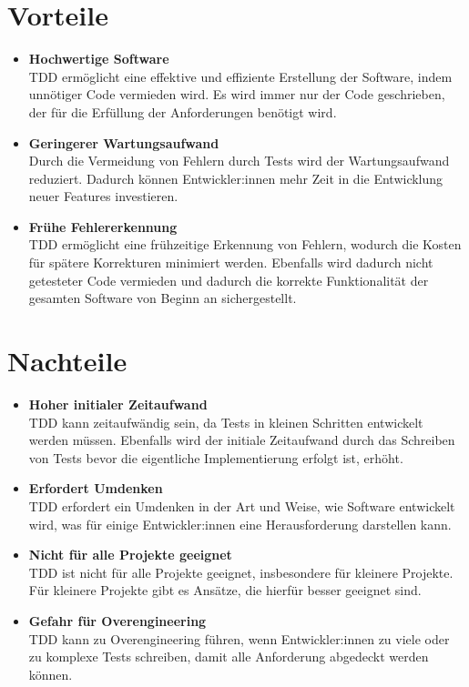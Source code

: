 \documentclass[a0,landscape]{a0poster}
\begin{document}
\begin{multicols}{4}
\section*{Vorteile}
\begin{itemize}
    \item \textbf{Hochwertige Software}\\
    TDD ermöglicht eine effektive und effiziente Erstellung der Software, indem unnötiger Code vermieden wird. Es wird immer nur der Code geschrieben, der für die Erfüllung der Anforderungen benötigt wird.
    \item \textbf{Geringerer Wartungsaufwand}\\
    Durch die Vermeidung von Fehlern durch Tests wird der Wartungsaufwand reduziert. Dadurch können Entwickler:innen mehr Zeit in die Entwicklung neuer Features investieren.
    \item \textbf{Frühe Fehlererkennung}\\
    TDD ermöglicht eine frühzeitige Erkennung von Fehlern, wodurch die Kosten für spätere Korrekturen minimiert werden. Ebenfalls wird dadurch nicht getesteter Code vermieden und dadurch die korrekte Funktionalität der gesamten Software von Beginn an sichergestellt.
\end{itemize}

\section*{Nachteile}
\begin{itemize}
    \item \textbf{Hoher initialer Zeitaufwand}\\
    TDD kann zeitaufwändig sein, da Tests in kleinen Schritten entwickelt werden müssen. Ebenfalls wird der initiale Zeitaufwand durch das Schreiben von Tests bevor die eigentliche Implementierung erfolgt ist, erhöht.
    \item \textbf{Erfordert Umdenken}\\
    TDD erfordert ein Umdenken in der Art und Weise, wie Software entwickelt wird, was für einige Entwickler:innen eine Herausforderung darstellen kann.
    \item \textbf{Nicht für alle Projekte geeignet}\\
    TDD ist nicht für alle Projekte geeignet, insbesondere für kleinere Projekte. Für kleinere Projekte gibt es Ansätze, die hierfür besser geeignet sind.
    \item \textbf{Gefahr für Overengineering}\\
    TDD kann zu Overengineering führen, wenn Entwickler:innen zu viele oder zu komplexe Tests schreiben, damit alle Anforderung abgedeckt werden können.
\end{itemize}


\end{multicols}
\end{document}
